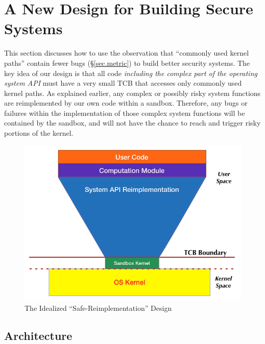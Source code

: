 \section{A New Design for Building Secure Systems}
\label{sec.design}

This section discusses how to use the observation
 that ``commonly used kernel paths'' contain fewer bugs 
(\S{\ref{sec.metric}}) to build better security systems.
The key idea of our design is that all code \emph{including the complex part
of the operating system API} must have a very small TCB that accesses only 
commonly used kernel paths. 
As explained earlier, any complex or possibly risky system functions 
are reimplemented by our own code within a sandbox. 
Therefore, any bugs or failures within the implementation of those complex system functions 
will be contained by the sandbox, and will not have the chance to reach 
and trigger risky portions of the kernel. 


\begin{figure}%
\centering
\includegraphics[width=1.0\columnwidth]{diagram/lind_secure_design.png}
\caption{The Idealized ``Safe-Reimplementation'' Design }
\label{fig:design}
\end{figure}

\subsection{Architecture}


